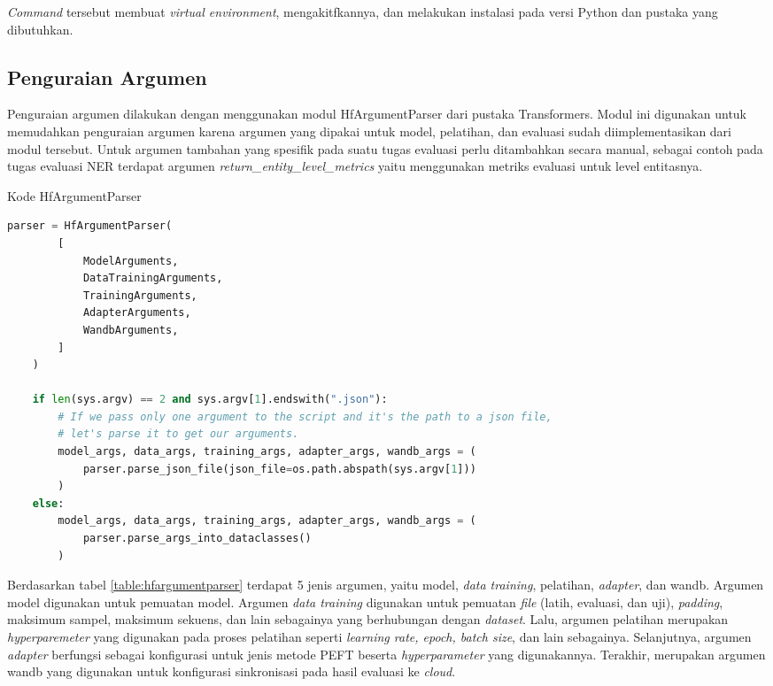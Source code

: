 \textit{Command} tersebut  membuat \textit{virtual environment}, mengakitfkannya, dan melakukan instalasi pada versi Python dan pustaka yang dibutuhkan.

\subsection{Penguraian Argumen}
\label{sec:parse-arg}

Penguraian argumen dilakukan dengan menggunakan modul HfArgumentParser dari pustaka Transformers. Modul ini digunakan untuk memudahkan penguraian argumen karena argumen yang dipakai untuk model, pelatihan, dan evaluasi sudah diimplementasikan dari modul tersebut. Untuk argumen tambahan yang spesifik pada suatu tugas evaluasi perlu ditambahkan secara manual, sebagai contoh pada tugas evaluasi NER terdapat argumen \textit{return\_entity\_level\_metrics} yaitu menggunakan metriks evaluasi untuk level entitasnya.

\begin{table}[h]
    \caption{Kode HfArgumentParser}
    \label{table:hfargumentparser}
    \begin{lstlisting}[language=python]
    parser = HfArgumentParser(
        [
            ModelArguments,
            DataTrainingArguments,
            TrainingArguments,
            AdapterArguments,
            WandbArguments,
        ]
    )

    if len(sys.argv) == 2 and sys.argv[1].endswith(".json"):
        # If we pass only one argument to the script and it's the path to a json file,
        # let's parse it to get our arguments.
        model_args, data_args, training_args, adapter_args, wandb_args = (
            parser.parse_json_file(json_file=os.path.abspath(sys.argv[1]))
        )
    else:
        model_args, data_args, training_args, adapter_args, wandb_args = (
            parser.parse_args_into_dataclasses()
        )
    \end{lstlisting}
\end{table}

Berdasarkan tabel \ref{table:hfargumentparser} terdapat 5 jenis argumen, yaitu model, \textit{data training}, pelatihan, \textit{adapter}, dan wandb. Argumen model digunakan untuk pemuatan model. Argumen \textit{data training} digunakan untuk pemuatan \textit{file} (latih, evaluasi, dan uji), \textit{padding}, maksimum sampel, maksimum sekuens, dan lain sebagainya yang berhubungan dengan \textit{dataset}. Lalu, argumen pelatihan merupakan \textit{hyperparemeter} yang digunakan pada proses pelatihan seperti \textit{learning rate, epoch, batch size}, dan lain sebagainya. Selanjutnya, argumen \textit{adapter} berfungsi sebagai konfigurasi untuk jenis metode PEFT beserta \textit{hyperparameter} yang digunakannya. Terakhir, merupakan argumen wandb yang digunakan untuk konfigurasi sinkronisasi pada hasil evaluasi ke \textit{cloud}.

